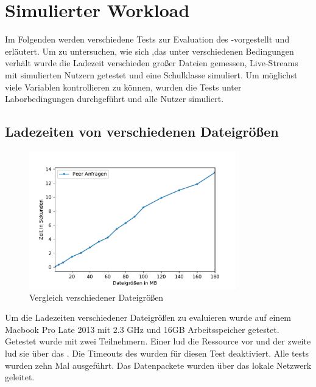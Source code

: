 %



\section{Simulierter Workload}

Im Folgenden werden verschiedene Tests zur Evaluation des \pTp-\cdns vorgestellt und erläutert. Um zu untersuchen, wie sich ,das \cdn unter verschiedenen Bedingungen verhält wurde die Ladezeit verschieden großer Dateien gemessen, Live-Streams mit simulierten Nutzern getestet und eine Schulklasse simuliert. Um möglichst viele Variablen kontrollieren zu können, wurden die Tests unter Laborbedingungen durchgeführt und alle Nutzer simuliert.

\subsection{Ladezeiten von verschiedenen Dateigrößen} \label{e:filesize}
\begin{figure}[!h]
	\centering
	\includegraphics[width=0.8\textwidth]{figures/Timing_file_size}
	\caption[A Figure Short-Title]{Vergleich verschiedener Dateigrößen}
	\label{fig:timing_file_size}
\end{figure}

Um die Ladezeiten verschiedener Dateigrößen zu evaluieren wurde auf einem Macbook Pro Late 2013 mit 2.3 GHz und 16GB Arbeitsspeicher getestet. 
Getestet wurde mit zwei Teilnehmern. Einer lud die Ressource vor und der zweite lud sie über das \pTp \cdn. Die Timeouts des \pTp \cdns wurden für diesen Test deaktiviert. Alle tests wurden zehn Mal ausgeführt. Das \pTp Datenpackete wurden über das lokale Netzwerk geleitet.

